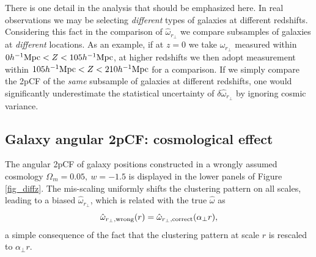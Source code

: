 \documentclass[iop]{emulateapj}
\begin{document}
There is one detail in the analysis that should be emphasized here.
In real observations we may be selecting {\it different} types of galaxies at different redshifts.
Considering this fact in the comparison of $\hat\omega_{r_\perp}$ 
we compare subsamples of galaxies at {\it different} locations.
As an example, if at $z=0$ we take $\hat\omega_{r_\perp}$ measured within $0h^{-1}{\rm Mpc}<Z<105 h^{-1}{\rm Mpc}$,
at higher redshifts we then adopt measurement within $105h^{-1}{\rm Mpc}<Z<210 h^{-1}{\rm Mpc}$ for a comparison.
If we simply compare the 2pCF of the {\it same} subsample of galaxies at different redshifts, 
one would significantly underestimate the statistical uncertainty of $\delta \hat{\omega}_{r_\perp}$ by ignoring cosmic variance.




\subsection{Galaxy angular 2pCF: cosmological effect }

The angular 2pCF of galaxy positions constructed in a wrongly assumed cosmology $\Omega_m=0.05,\ w=-1.5$
is displayed in the lower panels of Figure \ref{fig_diffz}.
The mis-scaling uniformly shifts the clustering pattern on all scales, 
leading to a biased $\hat \omega_{r_\perp}$, which is 
related with the true $\hat \omega$ as
\begin{equation}
 \hat \omega_{r_\perp,\rm wrong}(r) = \hat \omega_{r_\perp, \rm correct}(\alpha_{\perp} r),
\end{equation}
a simple consequence of the fact that the clustering pattern at scale $r$ is rescaled to $\alpha_{\perp} r$.
\end{document}

